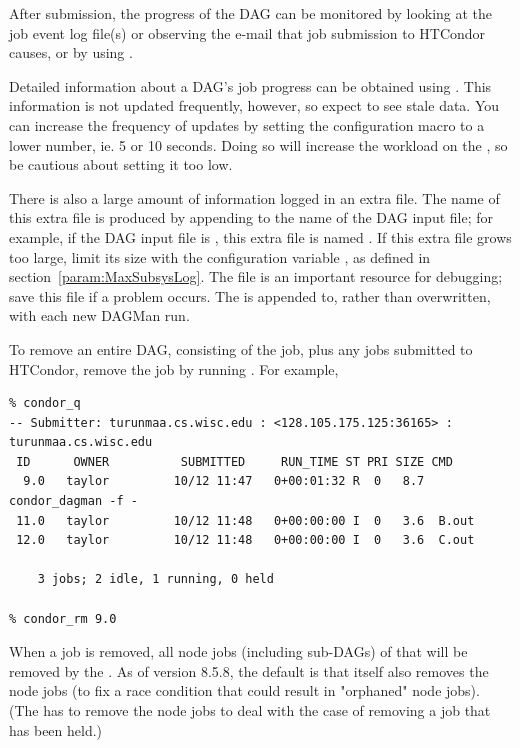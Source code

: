 
After submission, the progress of the DAG can be monitored
by looking at the job event log file(s) or
observing the e-mail that job submission to HTCondor causes,
or by using  .

Detailed information about a DAG's job progress can be obtained using  
 . This information is not updated frequently, however, so
expect to see stale data. You can increase the frequency of updates by setting
the  configuration macro to a lower 
number, ie. 5 or 10 seconds. Doing so will increase the workload on the
, so be cautious about setting it too low.

There is also a large amount of information logged in an extra file.
The name of this extra file is produced by appending
 to the name of the DAG input file; 
for example, if the DAG input file is , 
this extra file is named .
If this extra file grows too large, limit its size
with the configuration variable ,
as defined in section~\ref{param:MaxSubsysLog}.
The  file is an important resource for
debugging; save this file if a problem occurs. 
The  is appended to, rather than overwritten, 
with each new DAGMan run.

To remove an entire DAG, consisting of the  job, 
plus any jobs submitted to HTCondor,
remove the  job by running .
For example,
\footnotesize
\begin{verbatim}
% condor_q
-- Submitter: turunmaa.cs.wisc.edu : <128.105.175.125:36165> : turunmaa.cs.wisc.edu
 ID      OWNER          SUBMITTED     RUN_TIME ST PRI SIZE CMD
  9.0   taylor         10/12 11:47   0+00:01:32 R  0   8.7  condor_dagman -f -
 11.0   taylor         10/12 11:48   0+00:00:00 I  0   3.6  B.out
 12.0   taylor         10/12 11:48   0+00:00:00 I  0   3.6  C.out

    3 jobs; 2 idle, 1 running, 0 held

% condor_rm 9.0
\end{verbatim}
\normalsize

When a  job is removed, all node jobs (including sub-DAGs)
of that  will be removed by the .  As of version
8.5.8, the default is that  itself also removes the
node jobs (to fix a race condition that could result in "orphaned"
node jobs).  (The  has to remove the node jobs to deal with
the case of removing a  job that has been held.)

